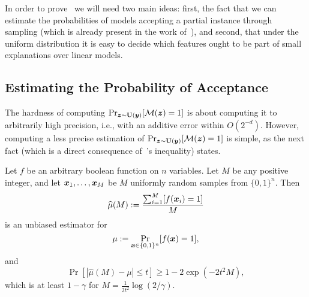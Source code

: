 

In order to prove~ we will need two main ideas: first, the fact that we can estimate the probabilities of models accepting a partial instance through sampling (which is already present in the work of~\citet{izza2024locallyminimalprobabilisticexplanations}), and second, that under the uniform distribution it is easy to decide which features ought to be part of small explanations over linear models.

\subsection{Estimating the Probability of Acceptance}
 The  hardness of computing
$\Pr_{{\bm{z}}  \sim \mathbf{U}({\bm{y}})}[\mathcal{M}({\bm{z}}) = 1]$ is about computing it to arbitrarily high precision, i.e., with an additive error within $O(2^{-d})$. However, computing a less precise estimation of $\Pr_{{\bm{z}} \sim \mathbf{U}({\bm{y}})}[\mathcal{M}({\bm{z}}) = 1]$ is simple, as the next fact (which is a direct consequence of~\citet{hoeffdingProbabilityInequalitiesSums1963a}'s inequality)  states.

\begin{fact}\label{fact:hoeffding}
    Let $f$ be an arbitrary boolean function on $n$ variables. Let $M$ be any positive integer,
    and let ${\bm{x}}_1, \ldots, {\bm{x}}_M$ be $M$ uniformly random samples from $\{0, 1\}^n$. Then 
    \[
        \widehat{\mu}(M) := \frac{\sum_{i=1}^M [f({\bm{x}}_i) = 1]}{M}
    \]
    is an unbiased estimator for 
    \[
        \mu := \Pr_{{\bm{x}} \in \{0, 1\}^n}[f({\bm{x}}) = 1],
    \]
    and 
    \[
    \Pr[\left|\widehat{\mu}(M) - \mu \right| \leq t] \geq 1 - 2\exp(-2t^2 M),
    \]
    which is at least $1 - \gamma$ for $M = \frac{1}{2t^2} \log(2/\gamma)$.
\end{fact}

